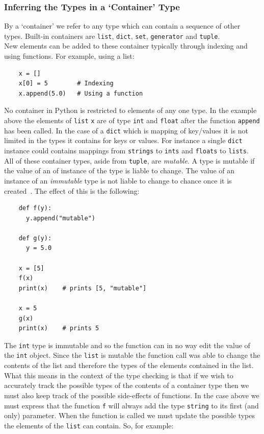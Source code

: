 \documentclass[12pt, titlepage]{article}
\begin{document}
\subsubsection{Inferring the Types in a `Container' Type}
\label{chap:inferringContainers}
By a `container' we refer to any type which can contain a sequence of other types. Built-in containers are \texttt{list}, \texttt{dict}, \texttt{set}, \texttt{generator} and \texttt{tuple}. \\
\indent New elements can be added to these container typically through indexing and using functions. For example, using a list:
\begin{lstlisting}
    x = []
    x[0] = 5        # Indexing
    x.append(5.0)   # Using a function
\end{lstlisting}
No container in Python is restricted to elements of any one type. In the example above the elements of \texttt{list} \texttt{x} are of type \texttt{int} and \texttt{float} after the function \texttt{append} has been called. In the case of a \texttt{dict} which is mapping of key/values it is not limited in the types it contains for keys or values. For instance a single \texttt{dict} instance could contains mappings from \texttt{strings} to \texttt{ints} and \texttt{floats} to \texttt{lists}. \\
\indent All of these container types, aside from \texttt{tuple}, are \textit{mutable}. A type is mutable if the value of an of instance of the type is liable to change. The value of an instance of an \textit{immutable} type is not liable to change to chance once it is created~\cite{pythonMutable}. The effect of this is the following:
\begin{lstlisting}
    def f(y):
      y.append("mutable")
     
    def g(y):
      y = 5.0
      
    x = [5]
    f(x)
    print(x)    # prints [5, "mutable"]
    
    x = 5
    g(x)
    print(x)    # prints 5
\end{lstlisting}
The \texttt{int} type is immutable and so the function can in no way edit the value of the \texttt{int} object. Since the \texttt{list} is mutable the function call was able to change the contents of the list and therefore the types of the elements contained in the list. What this means in the context of the type checking is that if we wish to accurately track the possible types of the contents of a container type then we must also keep track of the possible side-effects of functions. In the case above we must express that the function \texttt{f} will always add the type \texttt{string} to its first (and only) parameter. When the function is called we must update the possible types the elements of the \texttt{list} can contain. So, for example:
\end{document}
